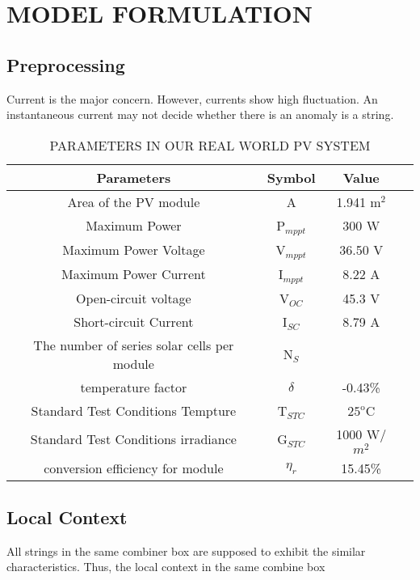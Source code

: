 \documentclass[journal]{IEEEtran}
\begin{document}
\section{MODEL FORMULATION}
\label{sctn:mdlfmlt}
\subsection{Preprocessing}
Current is the major concern. However, currents show high fluctuation. An instantaneous current may not decide whether there is an anomaly is a string.
\begin{table}[!h]
\scriptsize
\caption{PARAMETERS IN OUR REAL WORLD PV SYSTEM}
 \label{sctn:model}
\centering
\begin{tabular}{| c | c | c  | c |}
\hline
  Parameters              & Symbol  & Value     \\
\hline
Area of the PV module         & A  & 1.941 m$^2$        \\
\hline
Maximum Power       & P$_{mppt}$  & 300 W    \\
\hline
Maximum Power Voltage       & V$_{mppt}$  &  36.50 V  \\
\hline
Maximum Power Current       & I$_{mppt}$  &  8.22 A \\
\hline
Open-circuit voltage        & V$_{OC}$  &  45.3 V  \\
\hline
Short-circuit Current        & I$_{SC}$  &  8.79 A \\
\hline
The number of series solar cells per module        & N$_{S}$  &    \\
\hline
temperature factor        & $\delta$  & -0.43\%   \\
\hline
Standard Test Conditions Tempture        & T$_{STC}$  & $25^\text{o}$C   \\
\hline
Standard Test Conditions irradiance        & G$_{STC}$  & 1000  W/$m^2$   \\
\hline
conversion efficiency for module        & $\eta_r$  & 15.45\%   \\
\hline
\end{tabular}
\label{tb:RE_Uniform}
\end{table}

\subsection{Local Context}
All strings in the same combiner box are supposed to exhibit the similar characteristics. Thus, the local context in the same combine box 
\end{document}
